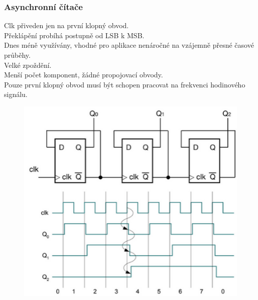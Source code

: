 \subsubsection{Asynchronní čítače}
Clk přiveden jen na první klopný obvod.\\
Překlápění probíhá postupně od LSB k MSB.\\
Dnes méně využívány, vhodné pro aplikace
nenáročné na vzájemně přesné časové průběhy.\\
Velké zpoždění.\\
Menší počet komponent, žádné propojovací obvody.\\
Pouze první klopný obvod musí být schopen pracovat na frekvenci hodinového signálu.\\
\begin{figure}[h!]
    \centering
    \includegraphics*[scale = 0.5]{img/AsynCit.png}
\end{figure}

